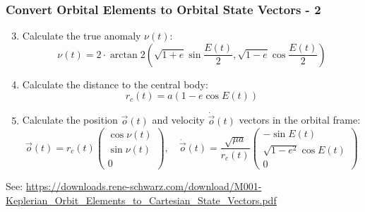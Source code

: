 \begin{frame}
    \frametitle{Convert Orbital Elements to Orbital State Vectors - 2}
    \btVFill
    \begin{enumerate}
        \setcounter{enumi}{2}
        \item Calculate the true anomaly $\nu(t)$:
        $$ \nu(t) = 2 \cdot\arctan2\left(\sqrt{1 + e} \sin{\frac{E(t)}{2}}, \sqrt{1 - e} \cos{\frac{E(t)}{2}} \right) $$
        \item Calculate the distance to the central body:
        $$ r_c(t) = a(1 - e \cos{E(t)}) $$
        \item Calculate the position $\vec{o}(t)$ and velocity $\dot{\vec{o}}(t)$ vectors in the orbital frame:
        $$ \vec{o}(t) = r_c(t) \begin{pmatrix} \cos{\nu(t)} \\ \sin{\nu(t)} \\ 0 \end{pmatrix}, \quad
           \dot{\vec{o}}(t) = \frac{\sqrt{\mu a}}{r_c(t)} \begin{pmatrix} -\sin{E(t)} \\ \sqrt{1 - e^2} \cos{E(t)} \\ 0 \end{pmatrix} $$
    \end{enumerate}
    \btVFill
    \setfontsize{8pt}
    See: \url{https://downloads.rene-schwarz.com/download/M001-Keplerian_Orbit_Elements_to_Cartesian_State_Vectors.pdf}
\end{frame}

